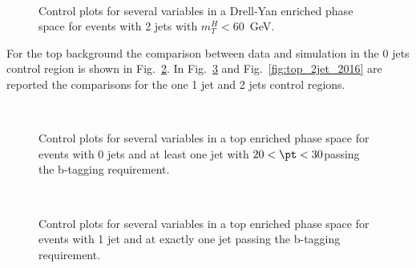 \begin{figure}[!h]
\centering
{}
\\
\caption{Control plots for several variables in a Drell-Yan enriched phase space for events with 2 jets with $m_{T}^{H} < 60$~GeV.}\label{fig:dy_2jet_2016}
\end{figure}


For the top background the comparison between data and simulation in the 0 jets control region is shown in Fig.~\ref{fig:top_0jet_2016}. In Fig.~\ref{fig:top_1jet_2016} and Fig.~\ref{fig:top_2jet_2016} are reported the comparisons for the one 1 jet and 2 jets control regions.



\begin{figure}[!h]
\centering
{}
\\
\caption{Control plots for several variables in a top enriched phase space for events with 0 jets and at least one jet with $20 < \pt < 30$\GeV passing the b-tagging requirement.}\label{fig:top_0jet_2016}
\end{figure}

\begin{figure}[!h]
\centering
{}
\\
\caption{Control plots for several variables in a top enriched phase space for events with 1 jet and at exactly one jet passing the b-tagging requirement.}\label{fig:top_1jet_2016}
\end{figure}

